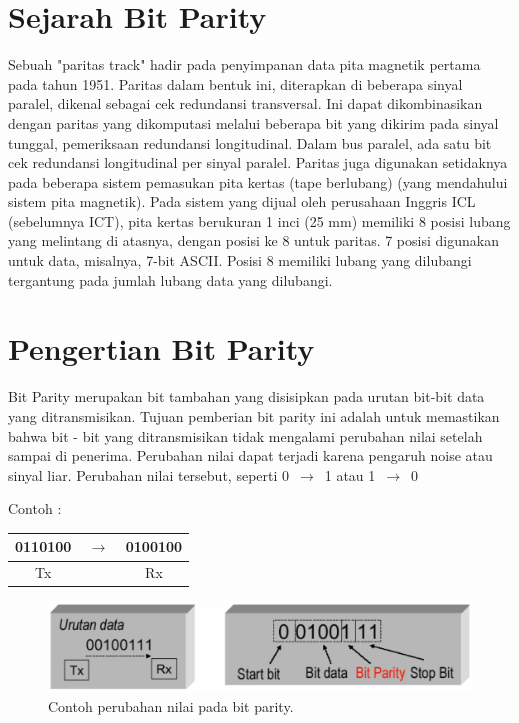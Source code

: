 ﻿%

\section{Sejarah Bit Parity}
Sebuah "paritas track" hadir pada penyimpanan data pita magnetik pertama pada tahun 1951. Paritas dalam bentuk ini, diterapkan di beberapa sinyal paralel, dikenal sebagai cek redundansi transversal. Ini dapat dikombinasikan dengan paritas yang dikomputasi melalui beberapa bit yang dikirim pada sinyal tunggal, pemeriksaan redundansi longitudinal. Dalam bus paralel, ada satu bit cek redundansi longitudinal per sinyal paralel. Paritas juga digunakan setidaknya pada beberapa sistem pemasukan pita kertas (tape berlubang) (yang mendahului sistem pita magnetik). Pada sistem yang dijual oleh perusahaan Inggris ICL (sebelumnya ICT), pita kertas berukuran 1 inci (25 mm) memiliki 8 posisi lubang yang melintang di atasnya, dengan posisi ke 8 untuk paritas. 7 posisi digunakan untuk data, misalnya, 7-bit ASCII. Posisi 8 memiliki lubang yang dilubangi tergantung pada jumlah lubang data yang dilubangi.


\section{Pengertian Bit Parity}
Bit Parity merupakan bit tambahan yang disisipkan pada urutan bit-bit data yang ditransmisikan. Tujuan pemberian bit parity ini adalah untuk memastikan bahwa bit - bit yang ditransmisikan tidak mengalami perubahan nilai setelah sampai di penerima. Perubahan nilai dapat terjadi karena pengaruh noise atau sinyal liar.
Perubahan nilai tersebut, seperti 0 $\,\to\,$ 1 atau 1 $\,\to\,$ 0

Contoh :

\begin{table}[h!]
\centering
\begin{tabular}{ c c c }
0110100 & $\,\to\,$ &  0100100\\
\hline
Tx &  & Rx \\
\end{tabular}
\end{table}

\begin{figure}[ht]
\centerline{\includegraphics[width=1\textwidth]{figures/perubahan_nilai_bit_parity.png}}
\caption{Contoh perubahan nilai pada bit parity.}
\label{perubahan_nilai_bit_parity}
\end{figure}

